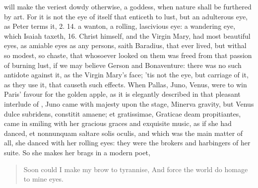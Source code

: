 will make the veriest dowdy otherwise, a goddess, when nature shall be
furthered by art. For it is not the eye of itself that enticeth to
lust, but an adulterous eye, as Peter terms it, 2.  14. a wanton, a
rolling, lascivious eye: a wandering eye, which Isaiah taxeth,  16.
Christ himself, and the Virgin Mary, had most beautiful eyes, as
amiable eyes as any persons, saith Baradius, that ever lived, but
withal so modest, so chaste, that whosoever looked on them was freed
from that passion of burning lust, if we may believe Gerson and
Bonaventure: there was no such antidote against it, as the Virgin
Mary's face; 'tis not the eye, but carriage of it, as they use it, that
causeth such effects. When Pallas, Juno, Venus, were to win Paris'
favour for the golden apple, as it is elegantly described in that
pleasant interlude of \Apuleius, Juno came with majesty upon the
stage, Minerva gravity, but Venus dulce subridens, constitit amaene; et
gratissimae, Graticae deam propitiantes, \etc{} came in smiling with her
gracious graces and exquisite music, as if she had danced, et
nonnunquam saltare solis oculis, and which was the main matter of all,
she danced with her rolling eyes: they were the brokers and harbingers
of her suite. So she makes her brags in a modern poet,

\begin{verse}%
Soon could I make my brow to tyrannise,
And force the world do homage to mine eyes.
\end{verse}%

